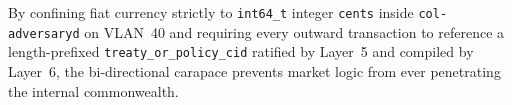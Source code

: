 By confining fiat currency strictly to \texttt{int64\_t} integer \texttt{cents} inside \texttt{col-adversaryd} on VLAN~40 and requiring every outward transaction to reference a length-prefixed \texttt{treaty\_or\_policy\_cid} ratified by Layer~5 and compiled by Layer~6, the bi-directional carapace prevents market logic from ever penetrating the internal commonwealth.
